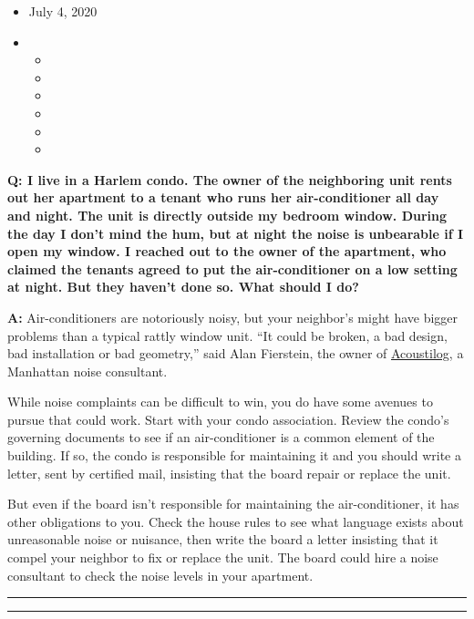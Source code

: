 \begin{itemize}
\item
  July 4, 2020
\item
  \begin{itemize}
  \item
  \item
  \item
  \item
  \item
  \item
  \end{itemize}
\end{itemize}

\textbf{Q: I live in a Harlem condo. The owner of the neighboring unit
rents out her apartment to a tenant who runs her air-conditioner all day
and night. The unit is directly outside my bedroom window. During the
day I don't mind the hum, but at night the noise is unbearable if I open
my window. I reached out to the owner of the apartment, who claimed the
tenants agreed to put the air-conditioner on a low setting at night. But
they haven't done so. What should I do?}

\textbf{A:} Air-conditioners are notoriously noisy, but your neighbor's
might have bigger problems than a typical rattly window unit. ``It could
be broken, a bad design, bad installation or bad geometry,'' said Alan
Fierstein, the owner of \href{https://www.acoustilog.com/}{Acoustilog},
a Manhattan noise consultant.

While noise complaints can be difficult to win, you do have some avenues
to pursue that could work. Start with your condo association. Review the
condo's governing documents to see if an air-conditioner is a common
element of the building. If so, the condo is responsible for maintaining
it and you should write a letter, sent by certified mail, insisting that
the board repair or replace the unit.

But even if the board isn't responsible for maintaining the
air-conditioner, it has other obligations to you. Check the house rules
to see what language exists about unreasonable noise or nuisance, then
write the board a letter insisting that it compel your neighbor to fix
or replace the unit. The board could hire a noise consultant to check
the noise levels in your apartment.

\begin{center}\rule{0.5\linewidth}{\linethickness}\end{center}

\begin{center}\rule{0.5\linewidth}{\linethickness}\end{center}


